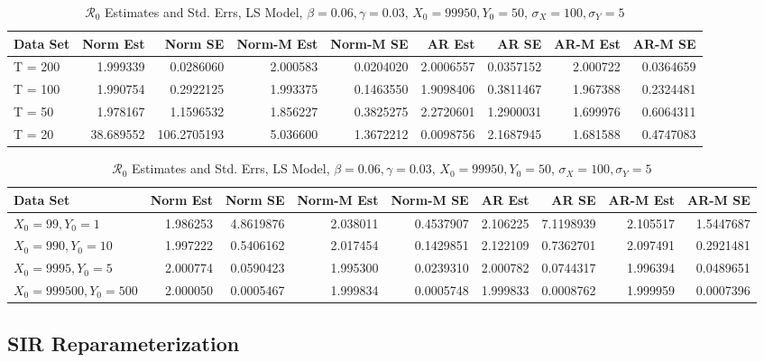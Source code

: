 \documentclass[12pt]{article}
\newcommand{\rr}{\ensuremath{\mathcal{R}_0}}
\begin{document}
\begin{table}[H]
	
	\caption{\label{tab:}$\rr$ Estimates and Std. Errs, LS Model,
		$\beta = 0.06, \gamma = 0.03$, $X_0 = 99950, Y_0 = 50$, $\sigma_X = 100, \sigma_Y = 5$}
	\centering
	\begin{tabular}[t]{l|r|r|r|r|r|r|r|r}
		\hline
		Data Set & Norm Est & Norm SE & Norm-M Est & Norm-M SE & AR Est & AR SE & AR-M Est & AR-M SE\\
		\hline
		T = 200 & 1.999339 & 0.0286060 & 2.000583 & 0.0204020 & 2.0006557 & 0.0357152 & 2.000722 & 0.0364659\\
		\hline
		T = 100 & 1.990754 & 0.2922125 & 1.993375 & 0.1463550 & 1.9098406 & 0.3811467 & 1.967388 & 0.2324481\\
		\hline
		T = 50 & 1.978167 & 1.1596532 & 1.856227 & 0.3825275 & 2.2720601 & 1.2900031 & 1.699976 & 0.6064311\\
		\hline
		T = 20 & 38.689552 & 106.2705193 & 5.036600 & 1.3672212 & 0.0098756 & 2.1687945 & 1.681588 & 0.4747083\\
		\hline
	\end{tabular}
\end{table}

\begin{table}[H]
	
	\caption{\label{tab:}$\rr$ Estimates and Std. Errs, LS Model,
		$\beta = 0.06, \gamma = 0.03$, $X_0 = 99950, Y_0 = 50$, $\sigma_X = 100, \sigma_Y = 5$}
	\centering
	\begin{tabular}[t]{l|r|r|r|r|r|r|r|r}
		\hline
		Data Set & Norm Est & Norm SE & Norm-M Est & Norm-M SE & AR Est & AR SE & AR-M Est & AR-M SE\\
		\hline
		$X_0 = 99, Y_0 = 1$ & 1.986253 & 4.8619876 & 2.038011 & 0.4537907 & 2.106225 & 7.1198939 & 2.105517 & 1.5447687\\
		\hline
		$X_0 = 990, Y_0 = 10$ & 1.997222 & 0.5406162 & 2.017454 & 0.1429851 & 2.122109 & 0.7362701 & 2.097491 & 0.2921481\\
		\hline
		$X_0 = 9995, Y_0 = 5$ & 2.000774 & 0.0590423 & 1.995300 & 0.0239310 & 2.000782 & 0.0744317 & 1.996394 & 0.0489651\\
		\hline
		$X_0 = 999500, Y_0 = 500$ & 2.000050 & 0.0005467 & 1.999834 & 0.0005748 & 1.999833 & 0.0008762 & 1.999959 & 0.0007396\\
		\hline
	\end{tabular}
\end{table}

\subsection{SIR Reparameterization}
\end{document}
